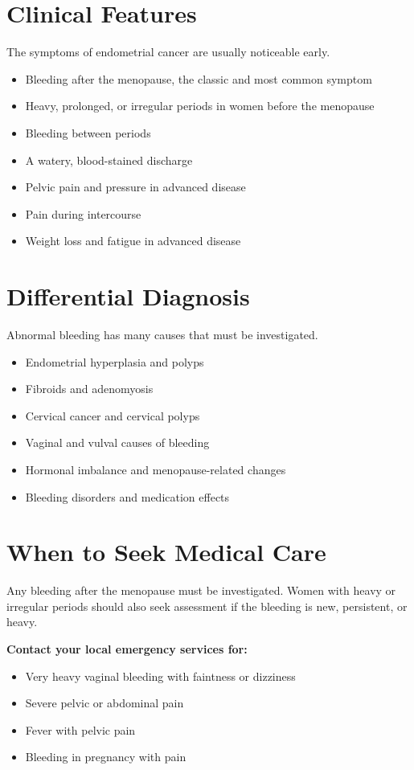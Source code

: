 \section*{Clinical Features}
The symptoms of endometrial cancer are usually noticeable early.
\begin{itemize}
    \item Bleeding after the menopause, the classic and most common symptom
    \item Heavy, prolonged, or irregular periods in women before the menopause
    \item Bleeding between periods
    \item A watery, blood-stained discharge
    \item Pelvic pain and pressure in advanced disease
    \item Pain during intercourse
    \item Weight loss and fatigue in advanced disease
\end{itemize}

\section*{Differential Diagnosis}
Abnormal bleeding has many causes that must be investigated.
\begin{itemize}
    \item Endometrial hyperplasia and polyps
    \item Fibroids and adenomyosis
    \item Cervical cancer and cervical polyps
    \item Vaginal and vulval causes of bleeding
    \item Hormonal imbalance and menopause-related changes
    \item Bleeding disorders and medication effects
\end{itemize}

\section*{When to Seek Medical Care}
Any bleeding after the menopause must be investigated. Women with heavy or irregular periods should also seek assessment if the bleeding is new, persistent, or heavy.

\textbf{Contact your local emergency services for:}
\begin{itemize}
    \item Very heavy vaginal bleeding with faintness or dizziness
    \item Severe pelvic or abdominal pain
    \item Fever with pelvic pain
    \item Bleeding in pregnancy with pain
\end{itemize}

